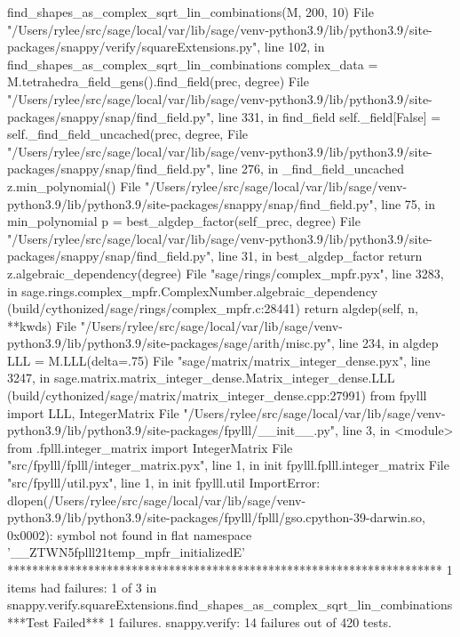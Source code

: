         find_shapes_as_complex_sqrt_lin_combinations(M, 200, 10)
      File "/Users/rylee/src/sage/local/var/lib/sage/venv-python3.9/lib/python3.9/site-packages/snappy/verify/squareExtensions.py", line 102, in find_shapes_as_complex_sqrt_lin_combinations
        complex_data = M.tetrahedra_field_gens().find_field(prec, degree)
      File "/Users/rylee/src/sage/local/var/lib/sage/venv-python3.9/lib/python3.9/site-packages/snappy/snap/find_field.py", line 331, in find_field
        self._field[False] = self._find_field_uncached(prec, degree,
      File "/Users/rylee/src/sage/local/var/lib/sage/venv-python3.9/lib/python3.9/site-packages/snappy/snap/find_field.py", line 276, in _find_field_uncached
        z.min_polynomial()
      File "/Users/rylee/src/sage/local/var/lib/sage/venv-python3.9/lib/python3.9/site-packages/snappy/snap/find_field.py", line 75, in min_polynomial
        p = best_algdep_factor(self_prec, degree)
      File "/Users/rylee/src/sage/local/var/lib/sage/venv-python3.9/lib/python3.9/site-packages/snappy/snap/find_field.py", line 31, in best_algdep_factor
        return z.algebraic_dependency(degree)
      File "sage/rings/complex_mpfr.pyx", line 3283, in sage.rings.complex_mpfr.ComplexNumber.algebraic_dependency (build/cythonized/sage/rings/complex_mpfr.c:28441)
        return algdep(self, n, **kwds)
      File "/Users/rylee/src/sage/local/var/lib/sage/venv-python3.9/lib/python3.9/site-packages/sage/arith/misc.py", line 234, in algdep
        LLL = M.LLL(delta=.75)
      File "sage/matrix/matrix_integer_dense.pyx", line 3247, in sage.matrix.matrix_integer_dense.Matrix_integer_dense.LLL (build/cythonized/sage/matrix/matrix_integer_dense.cpp:27991)
        from fpylll import LLL, IntegerMatrix
      File "/Users/rylee/src/sage/local/var/lib/sage/venv-python3.9/lib/python3.9/site-packages/fpylll/__init__.py", line 3, in <module>
        from .fplll.integer_matrix import IntegerMatrix
      File "src/fpylll/fplll/integer_matrix.pyx", line 1, in init fpylll.fplll.integer_matrix
      File "src/fpylll/util.pyx", line 1, in init fpylll.util
    ImportError: dlopen(/Users/rylee/src/sage/local/var/lib/sage/venv-python3.9/lib/python3.9/site-packages/fpylll/fplll/gso.cpython-39-darwin.so, 0x0002): symbol not found in flat namespace '__ZTWN5fplll21temp_mpfr_initializedE'
**********************************************************************
1 items had failures:
   1 of   3 in snappy.verify.squareExtensions.find_shapes_as_complex_sqrt_lin_combinations
***Test Failed*** 1 failures.
snappy.verify:
   14 failures out of 420 tests.

